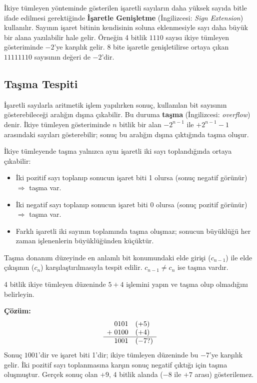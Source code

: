İkiye tümleyen yönteminde gösterilen işaretli sayıların daha yüksek sayıda bitle ifade edilmesi gerektiğinde \textbf{İşaretle Genişletme} (İngilizcesi: \textit{Sign Extension}) kullanılır. Sayının işaret bitinin kendisinin soluna eklenmesiyle sayı daha büyük bir alana yazılabilir hale gelir. Örneğin 4 bitlik $1110$ sayısı ikiye tümleyen gösteriminde $-2$'ye karşılık gelir. 8 bite işaretle genişletilirse ortaya çıkan $11111110$ sayısının değeri de $-2$'dir.

\subsection{Taşma Tespiti}
\label{sec:tasma-tespiti}

İşaretli sayılarla aritmetik işlem yapılırken sonuç, kullanılan bit sayısının gösterebileceği aralığın dışına çıkabilir. Bu duruma \textbf{taşma} (İngilizcesi: \textit{overflow}) denir. İkiye tümleyen gösteriminde $n$ bitlik bir alan $-2^{n-1}$ ile $+2^{n-1}-1$ arasındaki sayıları gösterebilir; sonuç bu aralığın dışına çıktığında taşma oluşur.

İkiye tümleyende taşma yalnızca aynı işaretli iki sayı toplandığında ortaya çıkabilir:
\begin{itemize}
    \item İki pozitif sayı toplanıp sonucun işaret biti 1 olursa (sonuç negatif görünür) $\Rightarrow$ taşma var.
    \item İki negatif sayı toplanıp sonucun işaret biti 0 olursa (sonuç pozitif görünür) $\Rightarrow$ taşma var.
    \item Farklı işaretli iki sayının toplamında taşma oluşmaz; sonucun büyüklüğü her zaman işlenenlerin büyüklüğünden küçüktür.
\end{itemize}

Taşma donanım düzeyinde en anlamlı bit konumundaki elde girişi ($c_{n-1}$) ile elde çıkışının ($c_n$) karşılaştırılmasıyla tespit edilir. $c_{n-1} \neq c_n$ ise taşma vardır.

\begin{ornek}[A.18]
4 bitlik ikiye tümleyen düzeninde $5 + 4$ işlemini yapın ve taşma olup olmadığını belirleyin.

\textbf{Çözüm:}
\[
\begin{array}{r@{\quad}l}
  0101 & (+5)\\
+\; 0100 & (+4)\\
\hline
  1001 & (-7\text{?})
\end{array}
\]
Sonuç $1001$'dir ve işaret biti 1'dir; ikiye tümleyen düzeninde bu $-7$'ye karşılık gelir. İki pozitif sayı toplanmasına karşın sonuç negatif çıktığı için taşma oluşmuştur. Gerçek sonuç olan $+9$, 4 bitlik alanda ($-8$ ile $+7$ arası) gösterilemez.
\end{ornek}

